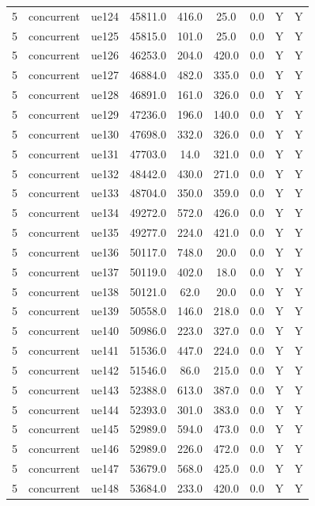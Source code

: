 \begin{table}[ht]
\begin{tabular}{|c|c|c|c|c|c|c|c|c|}
5 & concurrent & ue124 & 45811.0 & 416.0 & 25.0 & 0.0 & Y & Y \\
5 & concurrent & ue125 & 45815.0 & 101.0 & 25.0 & 0.0 & Y & Y \\
5 & concurrent & ue126 & 46253.0 & 204.0 & 420.0 & 0.0 & Y & Y \\
5 & concurrent & ue127 & 46884.0 & 482.0 & 335.0 & 0.0 & Y & Y \\
5 & concurrent & ue128 & 46891.0 & 161.0 & 326.0 & 0.0 & Y & Y \\
5 & concurrent & ue129 & 47236.0 & 196.0 & 140.0 & 0.0 & Y & Y \\
5 & concurrent & ue130 & 47698.0 & 332.0 & 326.0 & 0.0 & Y & Y \\
5 & concurrent & ue131 & 47703.0 & 14.0 & 321.0 & 0.0 & Y & Y \\
5 & concurrent & ue132 & 48442.0 & 430.0 & 271.0 & 0.0 & Y & Y \\
5 & concurrent & ue133 & 48704.0 & 350.0 & 359.0 & 0.0 & Y & Y \\
5 & concurrent & ue134 & 49272.0 & 572.0 & 426.0 & 0.0 & Y & Y \\
5 & concurrent & ue135 & 49277.0 & 224.0 & 421.0 & 0.0 & Y & Y \\
5 & concurrent & ue136 & 50117.0 & 748.0 & 20.0 & 0.0 & Y & Y \\
5 & concurrent & ue137 & 50119.0 & 402.0 & 18.0 & 0.0 & Y & Y \\
5 & concurrent & ue138 & 50121.0 & 62.0 & 20.0 & 0.0 & Y & Y \\
5 & concurrent & ue139 & 50558.0 & 146.0 & 218.0 & 0.0 & Y & Y \\
5 & concurrent & ue140 & 50986.0 & 223.0 & 327.0 & 0.0 & Y & Y \\
5 & concurrent & ue141 & 51536.0 & 447.0 & 224.0 & 0.0 & Y & Y \\
5 & concurrent & ue142 & 51546.0 & 86.0 & 215.0 & 0.0 & Y & Y \\
5 & concurrent & ue143 & 52388.0 & 613.0 & 387.0 & 0.0 & Y & Y \\
5 & concurrent & ue144 & 52393.0 & 301.0 & 383.0 & 0.0 & Y & Y \\
5 & concurrent & ue145 & 52989.0 & 594.0 & 473.0 & 0.0 & Y & Y \\
5 & concurrent & ue146 & 52989.0 & 226.0 & 472.0 & 0.0 & Y & Y \\
5 & concurrent & ue147 & 53679.0 & 568.0 & 425.0 & 0.0 & Y & Y \\
5 & concurrent & ue148 & 53684.0 & 233.0 & 420.0 & 0.0 & Y & Y \\

\end{tabular}
\end{table}
